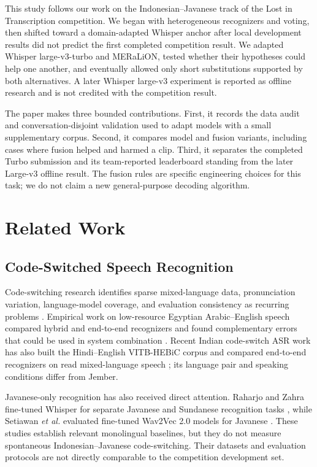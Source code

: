 \documentclass[journal]{IEEEtran}
\begin{document}
This study follows our work on the Indonesian--Javanese track of the Lost in Transcription competition. We began with heterogeneous recognizers and voting, then shifted toward a domain-adapted Whisper anchor after local development results did not predict the first completed competition result. We adapted Whisper large-v3-turbo and MERaLiON, tested whether their hypotheses could help one another, and eventually allowed only short substitutions supported by both alternatives. A later Whisper large-v3 experiment is reported as offline research and is not credited with the competition result.

The paper makes three bounded contributions. First, it records the data audit and conversation-disjoint validation used to adapt models with a small supplementary corpus. Second, it compares model and fusion variants, including cases where fusion helped and harmed a clip. Third, it separates the completed Turbo submission and its team-reported leaderboard standing from the later Large-v3 offline result. The fusion rules are specific engineering choices for this task; we do not claim a new general-purpose decoding algorithm.

\section{Related Work}
\subsection{Code-Switched Speech Recognition}
Code-switching research identifies sparse mixed-language data, pronunciation variation, language-model coverage, and evaluation consistency as recurring problems \cite{mustafa}. Empirical work on low-resource Egyptian Arabic--English speech compared hybrid and end-to-end recognizers and found complementary errors that could be used in system combination \cite{hamed}. Recent Indian code-switch ASR work has also built the Hindi--English VITB-HEBiC corpus and compared end-to-end recognizers on read mixed-language speech \cite{jain}; its language pair and speaking conditions differ from Jember.

Javanese-only recognition has also received direct attention. Raharjo and Zahra fine-tuned Whisper for separate Javanese and Sundanese recognition tasks \cite{raharjo}, while Setiawan \emph{et al.} evaluated fine-tuned Wav2Vec 2.0 models for Javanese \cite{setiawan}. These studies establish relevant monolingual baselines, but they do not measure spontaneous Indonesian--Javanese code-switching. Their datasets and evaluation protocols are not directly comparable to the competition development set.
\end{document}
